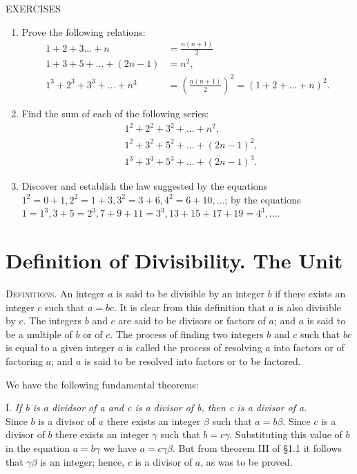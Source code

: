 \documentclass[oneside,12pt]{book}
\begin{document}
\begin{center}
    \uppercase{Exercises}
\end{center}
\renewcommand{\labelenumi}{\arabic{enumi}.}
\begin{enumerate}
    \item Prove the following relations:
        \begin{align*}
            1+2+3\dots+n&=\frac{n(n+1)}{2} \\
            1+3+5+\dots+(2n-1)&= n^2, \\
            1^3+2^3+3^3+\dots+n^3&=\left(\frac{n(n+1)}{2}\right)^2=(1+2+\dots+n)^2.
        \end{align*}
    \item Find the sum of each of the following series:
        \begin{align*}
            &1^2+2^2+3^2+\dots+n^2, \\
            &1^2+3^2+5^2+\dots+(2n-1)^2, \\
            &1^3+3^3+5^3+\dots+(2n-1)^3.
        \end{align*}
    \item Discover and establish the law suggested by the equations $1^2=0+1,2^2=1+3,3^2=3+6,4^2=6+10,\dots$; by the equations $1=1^3,3+5=2^3,7+9+11=3^3,13+15+17+19=4^3,\dots$. 
\end{enumerate}

\section{Definition of Divisibility. The Unit}
\textsc{Definitions.} An integer $a$ is said to be divisible by an integer $b$ if there exists an integer $c$ such that $a=bc$. It is clear from this definition that $a$ is also divisible by $c$. The integers $b$ and $c$ are said to be divisors or factors of $a$; and $a$ is said to be a multiple of $b$ or of $c$. The process of finding two integers $b$ and $c$ such that $bc$ is equal to a given integer $a$ is called the process of resolving $a$ into factors or of factoring $a$; and $a$ is said to be resolved into factors or to be factored. \par 

We have the following fundamental theorems: \par 

I. \textit{If b is a dividsor of a and c is a divisor of b, then c is a divisor of a.} \\
\indent Since $b$ is a divisor of $a$ there exists an integer $\beta$ such that $a=b\beta$. Since $c$ is a divisor of $b$ there exists an integer $\gamma$ such that $b=c\gamma$. Substituting this value of $b$ in the equation $a=b\gamma$ we have $a=c\gamma\beta$. But from theorem III of \S 1.1 it follows that $\gamma\beta$ is an integer; hence, $c$ is a divisor of $a$, as was to be proved. \par 
\end{document}
